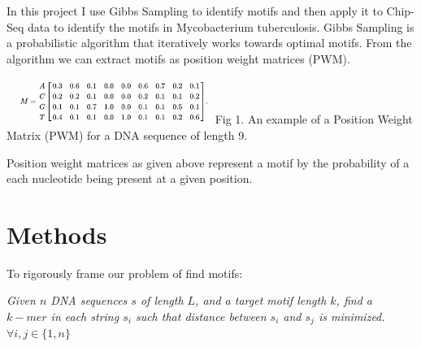 \documentclass[12pt]{scrartcl} %
\begin{document}
In this project I use Gibbs Sampling to identify motifs and then apply it to Chip-Seq data to identify the motifs in Mycobacterium tuberculosis.
Gibbs Sampling is a probabilistic algorithm that iteratively works towards optimal motifs. From the algorithm we can extract motifs as 
position weight matrices (PWM).

\begin{center}
\includegraphics[width=0.5\textwidth]{PWM_Example.png}
\newline Fig 1. An example of a Position Weight Matrix (PWM) \newline for a DNA sequence of length 9. 
\end{center}

Position weight matrices as given above represent a motif by the probability of a each nucleotide being present at a given position. 

\section{Methods}
To rigorously frame our problem of find motifs: 

\emph{Given $n$ DNA sequences $s$ of length $L$, and a target 
motif length $k$, find a $k-mer$ in each string $s_i$ such that distance between $s_i$ and $s_j$ is minimized. $\forall i , j \in \{1,n\}$}
\end{document}
